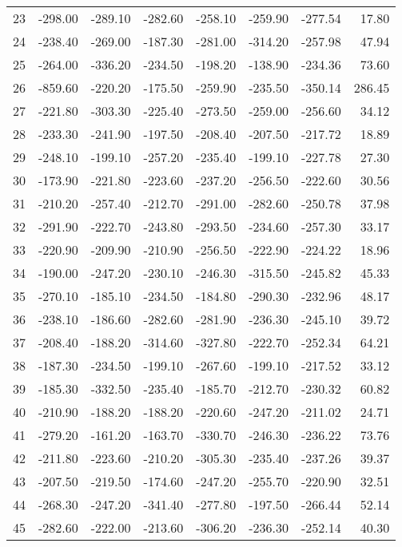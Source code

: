\begin{longtable}{rrrrrrrr}
23 & -298.00 & -289.10 & -282.60 & -258.10 & -259.90 & -277.54 & 17.80  \\
24 & -238.40 & -269.00 & -187.30 & -281.00 & -314.20 & -257.98 & 47.94  \\
25 & -264.00 & -336.20 & -234.50 & -198.20 & -138.90 & -234.36 & 73.60  \\
26 & -859.60 & -220.20 & -175.50 & -259.90 & -235.50 & -350.14 & 286.45  \\
27 & -221.80 & -303.30 & -225.40 & -273.50 & -259.00 & -256.60 & 34.12  \\
28 & -233.30 & -241.90 & -197.50 & -208.40 & -207.50 & -217.72 & 18.89  \\
29 & -248.10 & -199.10 & -257.20 & -235.40 & -199.10 & -227.78 & 27.30  \\
30 & -173.90 & -221.80 & -223.60 & -237.20 & -256.50 & -222.60 & 30.56  \\
31 & -210.20 & -257.40 & -212.70 & -291.00 & -282.60 & -250.78 & 37.98  \\
32 & -291.90 & -222.70 & -243.80 & -293.50 & -234.60 & -257.30 & 33.17  \\
33 & -220.90 & -209.90 & -210.90 & -256.50 & -222.90 & -224.22 & 18.96  \\
34 & -190.00 & -247.20 & -230.10 & -246.30 & -315.50 & -245.82 & 45.33  \\
35 & -270.10 & -185.10 & -234.50 & -184.80 & -290.30 & -232.96 & 48.17  \\
36 & -238.10 & -186.60 & -282.60 & -281.90 & -236.30 & -245.10 & 39.72  \\
37 & -208.40 & -188.20 & -314.60 & -327.80 & -222.70 & -252.34 & 64.21  \\
38 & -187.30 & -234.50 & -199.10 & -267.60 & -199.10 & -217.52 & 33.12  \\
39 & -185.30 & -332.50 & -235.40 & -185.70 & -212.70 & -230.32 & 60.82  \\
40 & -210.90 & -188.20 & -188.20 & -220.60 & -247.20 & -211.02 & 24.71  \\
41 & -279.20 & -161.20 & -163.70 & -330.70 & -246.30 & -236.22 & 73.76  \\
42 & -211.80 & -223.60 & -210.20 & -305.30 & -235.40 & -237.26 & 39.37  \\
43 & -207.50 & -219.50 & -174.60 & -247.20 & -255.70 & -220.90 & 32.51  \\
44 & -268.30 & -247.20 & -341.40 & -277.80 & -197.50 & -266.44 & 52.14  \\
45 & -282.60 & -222.00 & -213.60 & -306.20 & -236.30 & -252.14 & 40.30  \\

\end{longtable}
